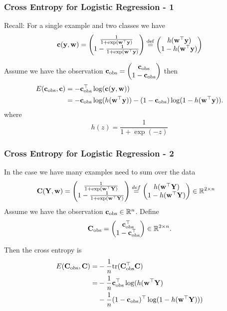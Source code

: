 \documentclass[12pt,fleqn,handout]{beamer}
\begin{document}
\begin{frame}
	\frametitle{Cross Entropy for Logistic Regression - 1}

Recall: For a single example and two classes we have
 $$
  {\bf c}({\bf y},{\bf w})  = \begin{pmatrix}
  	{\frac 1 {1+\exp({\bf w}^{\top} {\bf y})}} \\
	1-{\frac 1 {1+\exp({\bf w}^{\top} {\bf y})}}
  \end{pmatrix} 
  \stackrel{\rm def}{=} 
  \begin{pmatrix}
  	h({\bf w}^{\top}{\bf y}) \\1-h({\bf w}^{\top}{\bf y})
  \end{pmatrix}
 $$

Assume we have the observation ${\bf c}_{\rm obs} = \begin{pmatrix}
	{\bf c}_{\rm obs} \\ 1-{\bf c}_{\rm obs}
\end{pmatrix}$ then
\begin{align*}
 E({\bf c}_{\rm obs}, {\bf c}) & = -{\bf c}_{\rm obs}^\top\log({\bf c}({\bf y},{\bf w})) \\
 & = -{\bf c}_{\rm obs} \log(h({\bf w}^{\top}{\bf y})) - (1-{\bf c}_{\rm obs})
\log(1-h({\bf w}^{\top}{\bf y})). 
\end{align*}
where
$$
 h(z) = \frac{1}{1+\exp(-z)}
$$
\end{frame}

\begin{frame}
	\frametitle{Cross Entropy for Logistic Regression - 2}


In the case we have many examples need to sum over the data
\begin{align*}
	{\bf C}({\bf Y},{\bf w}) & = \begin{pmatrix}
		{\frac 1 {1+\exp({\bf w}^\top {\bf Y})}} \\
		1-{\frac 1 {1+\exp({\bf w}^\top{\bf Y})}}
	\end{pmatrix}  \stackrel{def}{=} \begin{pmatrix}
		h({\bf w}^\top {\bf Y})\\ 1-h({\bf w}^\top{\bf Y})
	\end{pmatrix}
	\in \mathbb{R}^{2\times n}
\end{align*}
Assume we have the observation ${\bf c}_{\rm obs}\in\mathbb{R}^n$. Define
$$
{\bf C}_{\rm obs} = \begin{pmatrix}
	{\bf c}_{\rm obs}^\top \\ 1-{\bf c}_{\rm obs}^\top
\end{pmatrix} \in \mathbb{R}^{2 \times n}.
$$

Then the cross entropy is
\begin{align*}
	E({\bf C}_{\rm obs}, {\bf C})  =& - \frac{1}{n} {\rm tr}({\bf C}_{\rm obs}^\top {\bf C}) \\
	 						 = & -\frac{1}{n} {\bf c}_{\rm obs}^{\top} \log(h({\bf w}^\top{\bf Y}) \\
							   & - \frac{1}{n}(1-{\bf c}_{\rm obs})^{\top}\log(1-h({\bf w}^\top{\bf Y})))
\end{align*}

\end{frame}
\end{document}
